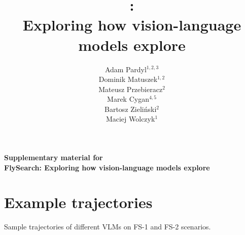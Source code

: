 \documentclass{article}
\title{\ours{}:\\Exploring how vision-language models explore}
\author{%
  Adam Pardyl$^{1,2,3}$ \\
  \And
  Dominik Matuszek$^{1,2}$ \\
  \And
  Mateusz Przebieracz$^{2}$ \\
  \And
  Marek Cygan$^{4,5}$ \\
  \And
  Bartosz Zieliński$^{2}$ \\
  \And
  Maciej Wolczyk$^{1}$ \\
}
\theoremstyle{plain}
\theoremstyle{definition}
\theoremstyle{remark}
\newcommand{\ours}{FlySearch}
\newcommand{\challenge}{FS-1}
\newcommand{\hardchallenge}{FS-2}
\begin{document}
\begin{center}
\textbf{\Large Supplementary material for \\[.2cm]
\ours{}: Exploring how vision-language models explore}
\end{center}


\section{Example trajectories}
Sample trajectories of different VLMs on \challenge{} and \hardchallenge{} scenarios.


\end{document}
